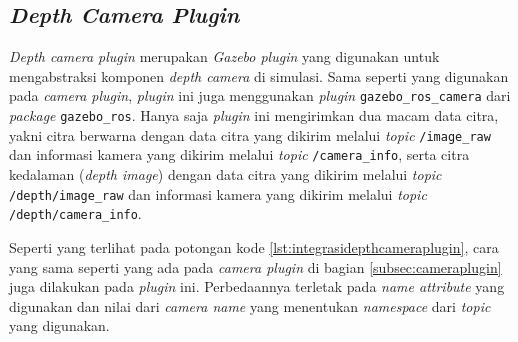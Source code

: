 \subsection{\emph{Depth Camera Plugin}}
\label{subsec:depthcameraplugin}

\emph{Depth camera plugin} merupakan \emph{Gazebo plugin} yang digunakan untuk mengabstraksi komponen \emph{depth camera} di simulasi.
Sama seperti yang digunakan pada \emph{camera plugin},
  \emph{plugin} ini juga menggunakan \emph{plugin} \lstinline{gazebo_ros_camera} dari \emph{package} \lstinline{gazebo_ros}.
Hanya saja \emph{plugin} ini mengirimkan dua macam data citra,
  yakni citra berwarna dengan data citra yang dikirim melalui \emph{topic} \lstinline{/image_raw} dan informasi kamera yang dikirim melalui \emph{topic} \lstinline{/camera_info},
  serta citra kedalaman (\emph{depth image}) dengan data citra yang dikirim melalui \emph{topic} \lstinline{/depth/image_raw} dan informasi kamera yang dikirim melalui \emph{topic} \lstinline{/depth/camera_info}.



Seperti yang terlihat pada potongan kode \ref{lst:integrasidepthcameraplugin},
  cara yang sama seperti yang ada pada \emph{camera plugin} di bagian \ref{subsec:cameraplugin} juga dilakukan pada \emph{plugin} ini.
Perbedaannya terletak pada \emph{name attribute} yang digunakan dan nilai dari \emph{camera name} yang menentukan \emph{namespace} dari \emph{topic} yang digunakan.

